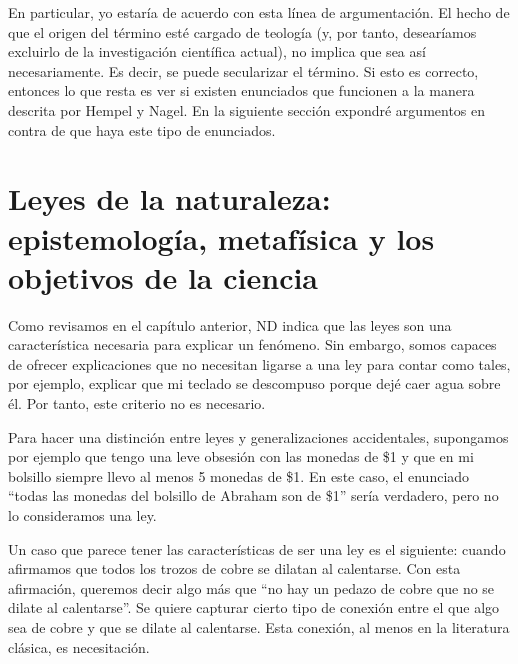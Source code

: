 En particular, yo estaría de acuerdo con esta línea de argumentación. El hecho de que el origen del término esté cargado de teología (y, por tanto, desearíamos excluirlo de la investigación científica actual), no implica que sea así necesariamente. Es decir, se puede secularizar el término. Si esto es correcto, entonces lo que resta es ver si existen enunciados que funcionen a la manera descrita por Hempel y Nagel. En la siguiente sección expondré argumentos en contra de que haya este tipo de enunciados.

\section{Leyes de la naturaleza: epistemología, metafísica y los objetivos de la ciencia}

\noindent Como revisamos en el capítulo anterior, ND indica que las leyes son una característica necesaria para explicar un fenómeno. Sin embargo, somos capaces de ofrecer explicaciones que no necesitan ligarse a una ley para contar como tales, por ejemplo, explicar que mi teclado se descompuso porque dejé caer agua sobre él. Por tanto, este criterio no es necesario.

Para hacer una distinción entre leyes y generalizaciones accidentales, supongamos por ejemplo que tengo una leve obsesión con las monedas de \$1 y que en mi bolsillo siempre llevo al menos 5 monedas de \$1. En este caso, el enunciado ``todas las monedas del bolsillo de Abraham son de \$1'' sería verdadero, pero no lo consideramos una ley.

Un caso que parece tener las características de ser una ley es el siguiente: cuando afirmamos que todos los trozos de cobre se dilatan al calentarse.  Con esta afirmación, queremos decir algo más que ``no hay un pedazo de cobre que no se dilate al calentarse''. Se quiere capturar cierto tipo de conexión entre el que algo sea de cobre y que se dilate al calentarse. Esta conexión, al menos en la literatura clásica, es necesitación.%

